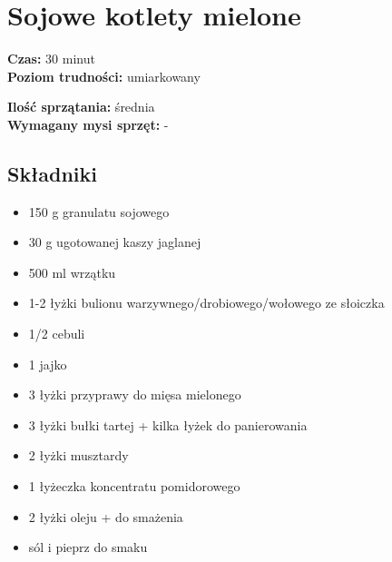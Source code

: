 \documentclass[a4paper,10pt]{book}
\begin{document}
\newpage 

\section{Sojowe kotlety mielone}
\bigskip
\small
\begin{minipage}{0.45\textwidth}
    \noindent \textbf{Czas:} 30 minut \\
    \textbf{Poziom trudności:} umiarkowany
\end{minipage}
\begin{minipage}{0.45\textwidth}
    \noindent \textbf{Ilość sprzątania:} średnia\\
    \textbf{Wymagany mysi sprzęt:} -
\end{minipage}
\normalsize
\vspace{0.5cm}

\begin{multicols}{2}

\subsection*{Składniki}
\begin{itemize}
    \item 150 g granulatu sojowego
    \item 30 g ugotowanej kaszy jaglanej
    \item 500 ml wrzątku
    \item 1-2 łyżki bulionu warzywnego/drobiowego/wołowego ze słoiczka
    \item 1/2 cebuli
    \item 1 jajko
    \item 3 łyżki przyprawy do mięsa mielonego
    \item 3 łyżki bułki tartej + kilka łyżek do panierowania
    \item 2 łyżki musztardy
    \item 1 łyżeczka koncentratu pomidorowego
    \item 2 łyżki oleju + do smażenia
    \item sól i pieprz do smaku
\end{itemize}

\columnbreak

\begin{figure}[H]
    \centering
\end{figure}
\end{multicols}
\end{document}
